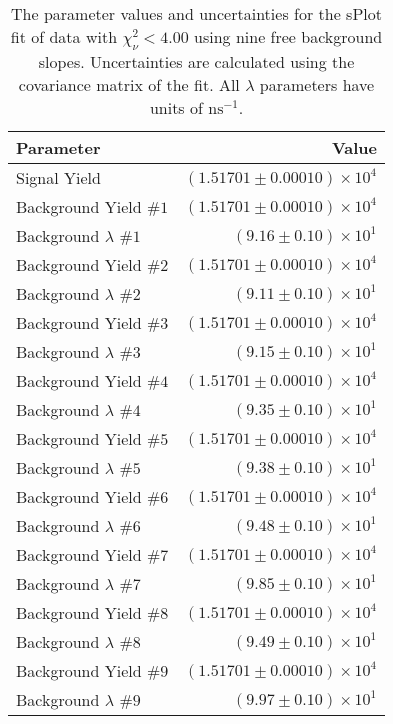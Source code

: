 
\begin{table}[ht]
    \begin{center}
        \begin{tabular}{lr}\toprule
            Parameter & Value \\\midrule
            Signal Yield & $(1.51701 \pm 0.00010) \times 10^{4}$ \\
            Background Yield $\#1$ & $(1.51701 \pm 0.00010) \times 10^{4}$ \\
            Background $\lambda$ $\#1$ & $(9.16 \pm 0.10) \times 10^{1}$ \\
            Background Yield $\#2$ & $(1.51701 \pm 0.00010) \times 10^{4}$ \\
            Background $\lambda$ $\#2$ & $(9.11 \pm 0.10) \times 10^{1}$ \\
            Background Yield $\#3$ & $(1.51701 \pm 0.00010) \times 10^{4}$ \\
            Background $\lambda$ $\#3$ & $(9.15 \pm 0.10) \times 10^{1}$ \\
            Background Yield $\#4$ & $(1.51701 \pm 0.00010) \times 10^{4}$ \\
            Background $\lambda$ $\#4$ & $(9.35 \pm 0.10) \times 10^{1}$ \\
            Background Yield $\#5$ & $(1.51701 \pm 0.00010) \times 10^{4}$ \\
            Background $\lambda$ $\#5$ & $(9.38 \pm 0.10) \times 10^{1}$ \\
            Background Yield $\#6$ & $(1.51701 \pm 0.00010) \times 10^{4}$ \\
            Background $\lambda$ $\#6$ & $(9.48 \pm 0.10) \times 10^{1}$ \\
            Background Yield $\#7$ & $(1.51701 \pm 0.00010) \times 10^{4}$ \\
            Background $\lambda$ $\#7$ & $(9.85 \pm 0.10) \times 10^{1}$ \\
            Background Yield $\#8$ & $(1.51701 \pm 0.00010) \times 10^{4}$ \\
            Background $\lambda$ $\#8$ & $(9.49 \pm 0.10) \times 10^{1}$ \\
            Background Yield $\#9$ & $(1.51701 \pm 0.00010) \times 10^{4}$ \\
            Background $\lambda$ $\#9$ & $(9.97 \pm 0.10) \times 10^{1}$ \\\bottomrule
        \end{tabular}
        \caption{The parameter values and uncertainties for the sPlot fit of data with $\chi^2_\nu < 4.00$ using nine free background slopes. Uncertainties are calculated using the covariance matrix of the fit. All $\lambda$ parameters have units of $\si{\nano\second}^{-1}$.}\label{tab:splot-fit-results-chisqdof-4.00-free-9}
    \end{center}
\end{table}
